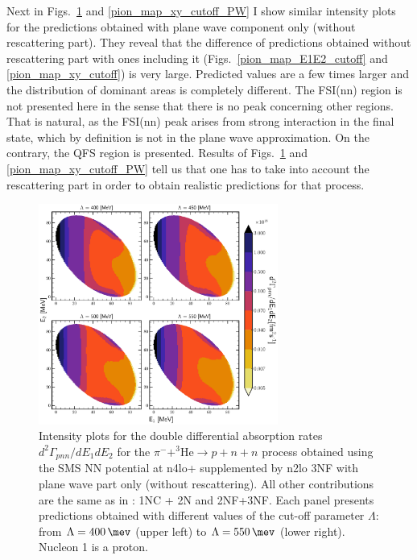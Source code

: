     Next in Figs.~\ref{pion_map_E1E2_cutoff_PW} and \ref{pion_map_xy_cutoff_PW} 
    I show similar intensity plots for the predictions obtained with plane wave component only (without rescattering part).
    They reveal that
    the difference of predictions obtained without rescattering part with ones including it
    (Figs.~\ref{pion_map_E1E2_cutoff} and \ref{pion_map_xy_cutoff}) is very large. 
    Predicted values are a few times larger and the distribution of dominant areas is completely different.
    The FSI(nn) region is not presented here
    in the sense that there is no peak concerning other regions.
    That is natural, as the FSI(nn) peak arises from strong interaction in the final state,
    which by definition is not in the plane wave approximation.
    On the contrary, the QFS region is presented.
    Results of Figs.~\ref{pion_map_E1E2_cutoff_PW} and \ref{pion_map_xy_cutoff_PW}
    tell us that one has to take into account the rescattering part in order to obtain
    realistic predictions for that process.  

    \begin{figure}[h]
        \begin{center}
        \includegraphics[width=0.7\textwidth]{PlotData/PION/Dalitz_maps/figures/Dalitz_map_pnn_E1E2_cutofs_PWIAS.pdf}
        \end{center}
        \caption{Intensity plots for the double differential absorption rates
        $d^2 \Gamma_{pnn}/dE_1dE_2$ for the $\pi^- + ^3\text{He} \rightarrow p + n + n$
        process obtained using the SMS NN potential at \gls{n4lo+} supplemented by \gls{n2lo} 3NF
        with plane wave part only (without rescattering).
        All other contributions are the same as in : 1NC + 2N and 2NF+3NF.
        Each panel presents predictions obtained with different values of the cut-off parameter $\Lambda$:
        from $\Lambda=\SI{400}{\mev}$ (upper left) to $\Lambda=\SI{550}{\mev}$ (lower right). Nucleon 1 is a proton.}
        \label{pion_map_E1E2_cutoff_PW}
    \end{figure}

